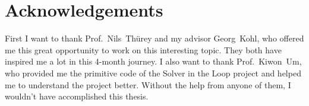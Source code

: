 \documentclass[a4paper,12pt,twoside]{report}
\begin{document}
\setlength{\evensidemargin}{22pt}
\setlength{\oddsidemargin}{22pt}

\def\doctype{Bachelor's Thesis}
\def\faculty{Informatik}
\def\title{Perceptual Losses for Deep Learning on Fluid Simulations}		%
\def\titleGer{Perceptual Losses für Deep Learning von Flüssigkeitssimulationen}	%
\def\supervisor{Prof.\ Dr.\  Nils Thürey}
\def\advisor{M.Sc.\ Georg Kohl}
\def\author{Hanfeng Wu}			%
\def\date{15.09.2021}		%



\lstset{showspaces=false, numbers=left, frame=single, basicstyle=\small}




\newpage
\thispagestyle{empty}
\mbox{}

\newpage
\thispagestyle{empty}
\mbox{}

\chapter*{Acknowledgements}
First I want to thank Prof.\ Nils\ Thürey and my advisor Georg\ Kohl, who offered me this great opportunity to work on this interesting topic. They both have inspired me a lot in this 4-month journey. I also want to thank Prof.\  Kiwon\ Um, who provided me the primitive code of the Solver in the Loop project and helped me to understand the project better. Without the help from anyone of them, I wouldn't have accomplished this thesis.


\end{document}
